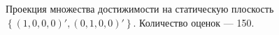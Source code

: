 \documentclass[10pt, a4paper]{article}
\begin{document}
\begin{figure}[H]
\caption{Проекция множества достижимости на статическую плоскость $\left\{(1,0,0,0)',(0,1,0,0)'\right\}$. Количество оценок --- 150.}
\end{figure}
\end{document}
